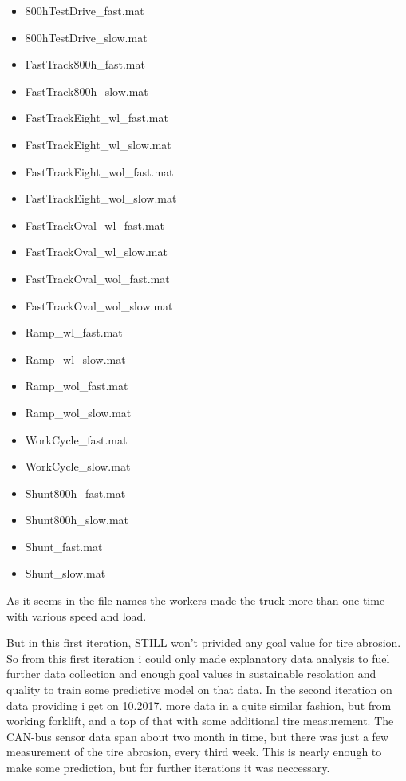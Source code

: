 \begin{itemize}[noitemsep]
    \item {800hTestDrive\_fast.mat}
    \item {800hTestDrive\_slow.mat}
    \item {FastTrack800h\_fast.mat}
 	\item {FastTrack800h\_slow.mat}
	\item {FastTrackEight\_wl\_fast.mat}
	\item {FastTrackEight\_wl\_slow.mat}
	\item {FastTrackEight\_wol\_fast.mat}
	\item {FastTrackEight\_wol\_slow.mat}
  	\item {FastTrackOval\_wl\_fast.mat}
	\item {FastTrackOval\_wl\_slow.mat}
	\item {FastTrackOval\_wol\_fast.mat}
	\item {FastTrackOval\_wol\_slow.mat}
	\item {Ramp\_wl\_fast.mat} 
	\item {Ramp\_wl\_slow.mat}
	\item {Ramp\_wol\_fast.mat}
	\item {Ramp\_wol\_slow.mat}
    \item {WorkCycle\_fast.mat}
    \item {WorkCycle\_slow.mat}
	\item {Shunt800h\_fast.mat}  	
  	\item {Shunt800h\_slow.mat}	
 	\item {Shunt\_fast.mat} 	
 	\item {Shunt\_slow.mat}
\end{itemize}

				\noindent
As it seems in the file names the workers made the truck more than one time with various speed and load.

But in this first iteration, STILL won't privided any goal value for tire abrosion. So from this first iteration i could only made explanatory data analysis to fuel further data collection and enough goal values in sustainable resolation and quality to train some predictive model on that data.
				\noindent
In the second iteration on data providing i get on 10.2017. more data in a quite similar fashion, but from working forklift, and a top of that with some additional tire measurement. The CAN-bus sensor data span about two month in time, but there was just a few measurement of the tire abrosion, every third week. This is nearly enough to make some prediction, but for further iterations it was neccessary.



